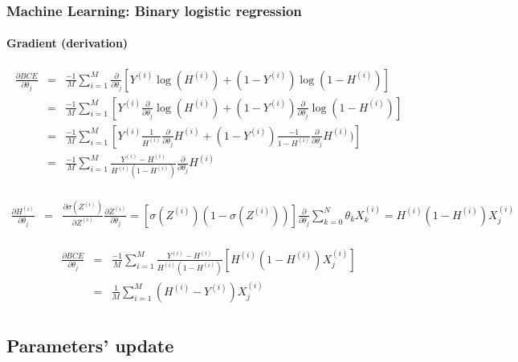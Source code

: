 \documentclass[xcolor=table]{beamer}
\begin{document}
\begin{frame}
	\frametitle{Machine Learning: Binary logistic regression}
	\framesubtitle{Gradient (derivation)}

	\tiny\vspace{-6pt}
	\begin{align*}
	\frac{\partial BCE}{\partial \theta_j} 
	& = & \frac{-1}{M} \sum\limits_{i=1}^{M} \frac{\partial}{\partial \theta_j} [Y^{(i)} \log(H^{(i)}) + (1- Y^{(i)}) \log(1 - H^{(i)})] \\
	& = & \frac{-1}{M} \sum\limits_{i=1}^{M} [ Y^{(i)} \frac{\partial}{\partial \theta_j} \log(H^{(i)}) + (1- Y^{(i)}) \frac{\partial}{\partial \theta_j}\log(1 - H^{(i)})]\\
	& = & \frac{-1}{M} \sum\limits_{i=1}^{M} [ Y^{(i)} \frac{1}{H^{(i)}} \frac{\partial}{\partial \theta_j} H^{(i)} + (1- Y^{(i)}) \frac{-1}{1-H^{(i)}} \frac{\partial}{\partial \theta_j} H^{(i)})] \\
	& = & \frac{-1}{M} \sum\limits_{i=1}^{M} \frac{Y^{(i)}-H^{(i)}}{H^{(i)}(1-H^{(i)})} \frac{\partial}{\partial \theta_j} H^{(i)} \\
	\end{align*}
	
	\vspace{-3pt}
	\begin{align*}
	\frac{\partial H^{(i)}}{\partial \theta_j} 
	& = & \frac{\partial \sigma(Z^{(i)})}{\partial Z^{(i)}} \frac{\partial Z^{(i)}}{\partial \theta_j}
	 =  [\sigma(Z^{(i)}) (1-\sigma(Z^{(i)}))]\frac{\partial}{\partial \theta_j} \sum\limits_{k=0}^{N} \theta_k X_k^{(i)} 
	 =  H^{(i)} (1-H^{(i)})  X_j^{(i)}\\
	\end{align*}
	
	\vspace{-3pt}
	\begin{align*}
	\frac{\partial BCE}{\partial \theta_j} 
	& = & \frac{-1}{M} \sum\limits_{i=1}^{M} \frac{Y^{(i)}-H^{(i)}}{H^{(i)}(1-H^{(i)})} [H^{(i)} (1-H^{(i)}) X_j^{(i)}] \\
	& = & \frac{1}{M} \sum\limits_{i=1}^{M} (H^{(i)} - Y^{(i)}) X_j^{(i)}\\
	\end{align*}
		
\end{frame}

\subsection{Parameters' update}
\end{document}
